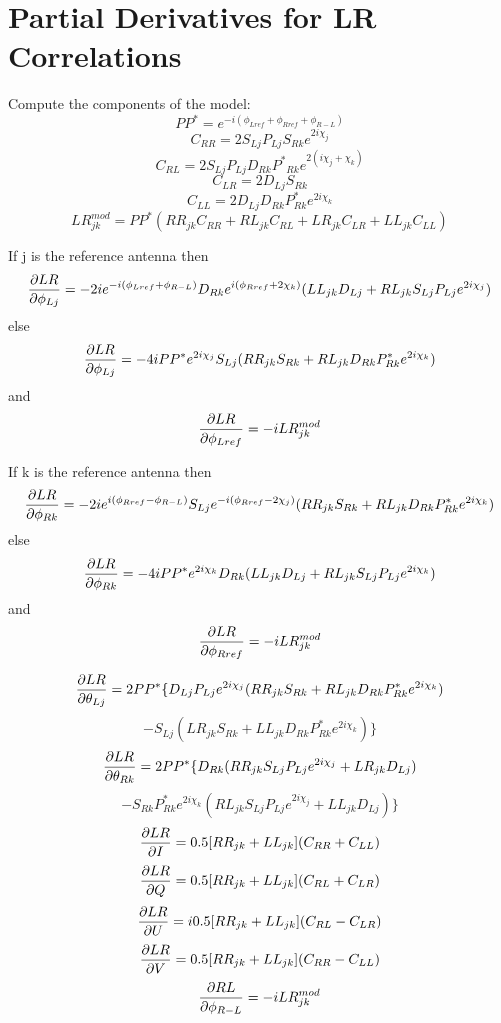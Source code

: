 \section{Partial Derivatives for LR Correlations}
Compute the components of the model:
$$PP^* = e^{-i(\phi_{Lref} + \phi_{Rref} + \phi_{R-L})} $$
$$C_{RR} =  2{S_{Lj}} {P_{Lj}}
   S_{Rk}  e^{2i\chi_j} $$
$$C_{RL} =  2{S_{Lj}} {P_{Lj}}
   {{D_{Rk}} {{P^*}_{Rk}}}
   e^{2(i\chi_j + \chi_k)}$$
$$C_{LR} =  2D_{Lj} S_{Rk} $$
$$C_{LL} =  2D_{Lj} D_{Rk} P^*_{Rk}  e^{2i\chi_k} $$
$$LR^{mod}_{jk} = PP^* (RR_{jk} C_{RR} + RL_{jk} C_{RL} +
   LR_{jk} C_{LR} + LL_{jk} C_{LL})$$

If j is the reference antenna then
$${\partial LR \over{\partial \phi_{Lj}}} =
    -2i e^{-i(\phi_{Lref} + \phi_{R-L})} D_{Rk} e^{i(\phi_{Rref} + 2\chi_k)}
   (LL_{jk}  {D_{Lj}} + RL_{jk} {S_{Lj}} {P_{Lj}} e^{2i\chi_j})$$
else
$${\partial LR \over{\partial \phi_{Lj}}} =
   -4i PP^* e^{2i\chi_j} S_{Lj}
   (RR_{jk}  {S_{Rk}} + RL_{jk}
   D_{Rk} P^*_{Rk} e^{2i\chi_k})$$
and
$${\partial LR \over{\partial \phi_{Lref}}} = -i LR^{mod}_{jk}$$

If k is the reference antenna then
$${\partial LR \over{\partial \phi_{Rk}}} =
    -2i e^{i(\phi_{Rref} - \phi_{R-L})} S_{Lj} {e^{-i(\phi_{Rref} - 2\chi_j)}}
   (RR_{jk}  {S_{Rk}} + RL_{jk} D_{Rk} P^*_{Rk} e^{2i\chi_k})$$
else
$${\partial LR \over{\partial \phi_{Rk}}} =
   -4i PP^* e^{2i\chi_k} D_{Rk}
   (LL_{jk}  {D_{Lj}} + RL_{jk}
   {S_{Lj}} {P_{Lj}} e^{2i\chi_k})$$
and
$${\partial LR \over{\partial \phi_{Rref}}} = -i LR^{mod}_{jk}$$

$${\partial LR \over{\partial \theta_{Lj}}} =
     2PP^* \{D_{Lj} P_{Lj}  e^{2i\chi_j} (RR_{jk}  {S_{Rk}} +
   RL_{jk}  D_{Rk} P^*_{Rk} e^{2i\chi_k})$$
   $$ - S_{Lj} (LR_{jk} {S_{Rk}} + LL_{jk}  D_{Rk}
   P^*_{Rk} e^{2i\chi_k})\}$$
$${\partial LR \over{\partial \theta_{Rk}}} =
    2PP^* \{D_{Rk} (RR_{jk}
    {S_{Lj}} {P_{Lj}} e^{2i\chi_j} + LR_{jk}  {D_{Lj}})$$
   $$ - S_{Rk} P^*_{Rk} e^{2i\chi_k} (RL_{jk}  {S_{Lj}}
   {P_{Lj}} e^{2i\chi_j} + LL_{jk} {D_{Lj}})\}$$
$${\partial LR \over{\partial I}} =
    0.5[RR_{jk} + LL_{jk}] (C_{RR} + C_{LL})$$
$${\partial LR \over{\partial Q}} =
    0.5[RR_{jk} + LL_{jk}] (C_{RL} + C_{LR}) $$
$${\partial LR \over{\partial U}} =
   i 0.5[RR_{jk} + LL_{jk}] (C_{RL} - C_{LR})$$
$${\partial LR \over{\partial V}} =
   0.5[RR_{jk} + LL_{jk}] (C_{RR} - C_{LL})$$
$${\partial RL \over{\partial \phi_{R-L}}} = -i  LR^{mod}_{jk} $$


